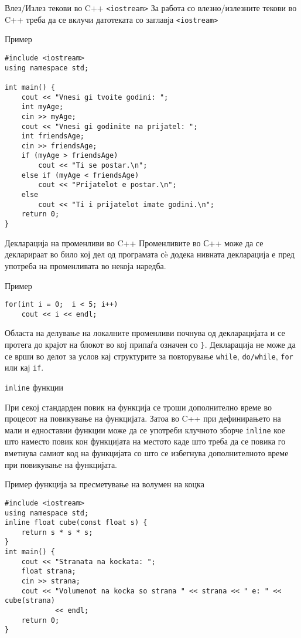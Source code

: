\begin{frame}[fragile]{Влез/Излез текови во C++ \texttt{<iostream>}}
За работа со влезно/излезните текови во C++ треба да се вклучи датотеката со
заглавја \texttt{<iostream>}
\begin{exampleblock}{Пример}
\begin{lstlisting}
#include <iostream>
using namespace std;

int main() {
    cout << "Vnesi gi tvoite godini: ";
    int myAge;
    cin >> myAge;
    cout << "Vnesi gi godinite na prijatel: ";
    int friendsAge;
    cin >> friendsAge;
    if (myAge > friendsAge)
        cout << "Ti se postar.\n";
    else if (myAge < friendsAge)
        cout << "Prijatelot e postar.\n";
    else
        cout << "Ti i prijatelot imate godini.\n";
    return 0;
}
\end{lstlisting}

\end{exampleblock}
\end{frame}

\begin{frame}[fragile]{Декларација на променливи во C++}
Променливите во С++ може да се декларираат во било кој дел од програмата сè
додека нивната декларација е пред употреба на променливата во некоја наредба.
\begin{exampleblock}{Пример}
\begin{lstlisting}
for(int i = 0;  i < 5; i++) 
    cout << i << endl;
\end{lstlisting}
\end{exampleblock}
Областа на делување на локалните променливи почнува од декларацијата и се
протега до крајот на блокот во кој припаѓа означен со \texttt{\}}. Декларација
не може да се врши во делот за услов кај структурите за повторување
\texttt{while}, \texttt{do/while}, \texttt{for} или кај \texttt{if}.
\end{frame}

\begin{frame}[fragile]{\texttt{inline} функции}
\begin{scriptsize}
При секој стандарден повик на функција се троши дополнително време во процесот
на повикување на функцијата. Затоа во C++ при дефинирањето на мали и едноставни
функции може да се употреби клучното зборче \texttt{inline} кое што наместо
повик кон функцијата на местото каде што треба да се повика го вметнува самиот
код на функцијата со што се избегнува дополнителното време при повикување на
функцијата.
\end{scriptsize}
\begin{exampleblock}{Пример функција за пресметување на волумен на коцка}
\begin{lstlisting}
#include <iostream>
using namespace std;
inline float cube(const float s) {
    return s * s * s;
}
int main() {
    cout << "Stranata na kockata: ";
    float strana;
    cin >> strana;
    cout << "Volumenot na kocka so strana " << strana << " e: " << cube(strana)
            << endl;
    return 0;
}
\end{lstlisting}
\end{exampleblock}
\end{frame}

